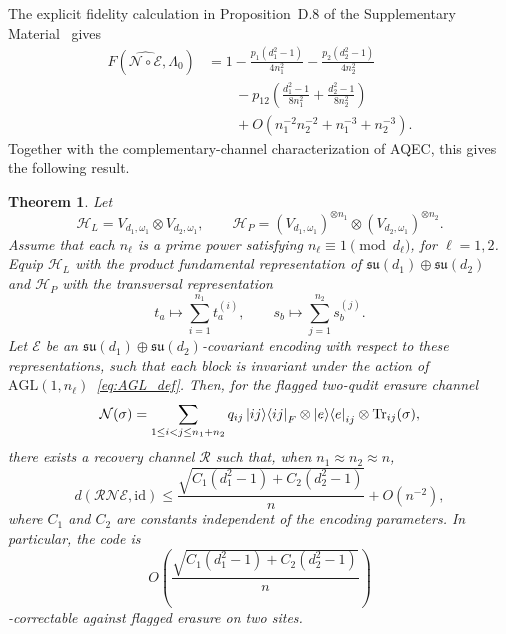 \documentclass[10pt,twocolumn,superscriptaddress,aps,amsmath,amssymb,citeautoscript,floatfix,prx,longbibliography]{revtex4-2}
\newtheorem{theorem}{Theorem}
\theoremstyle{plain}
\theoremstyle{plain}
\theoremstyle{plain}
\theoremstyle{plain}
\theoremstyle{plain}
\theoremstyle{plain}
\begin{document}
The explicit fidelity calculation in Proposition~D.8 of the Supplementary Material~\cite{SuppMat} gives
\begin{equation}\label{eq:fidelity_2}
\begin{aligned}
    F\left(\widehat{\mathcal N\circ\mathcal E},\Lambda_0\right)
    &=
    1
    -
    \frac{p_1(d_1^2-1)}{4n_1^2}
    -
    \frac{p_2(d_2^2-1)}{4n_2^2}
    \\
    &\qquad
    -
    p_{12}
    \left(
        \frac{d_1^2-1}{8n_1^2}
        +
        \frac{d_2^2-1}{8n_2^2}
    \right)
    \\
    &\qquad
    +
    O\left(n_1^{-2}n_2^{-2}+n_1^{-3}+n_2^{-3}\right).
\end{aligned}
\end{equation}
Together with the complementary-channel characterization of AQEC, this gives the following result.

\begin{theorem}
Let
$$
    \mathcal H_L
    =
    V_{d_1,\omega_1}
    \otimes
    V_{d_2,\omega_1},
    \qquad
    \mathcal H_P
    =
    (V_{d_1,\omega_1})^{\otimes n_1}
    \otimes
    (V_{d_2,\omega_1})^{\otimes n_2}.
$$
Assume that each $n_\ell$ is a prime power satisfying $n_\ell\equiv 1\pmod{d_\ell}$, for $\ell=1,2$. Equip $\mathcal H_L$ with the product fundamental representation of $\mathfrak{su}(d_1)\oplus\mathfrak{su}(d_2)$ and $\mathcal H_P$ with the transversal representation
$$
    t_a
    \longmapsto
    \sum_{i=1}^{n_1} t_a^{(i)},
    \qquad
    s_b
    \longmapsto
    \sum_{j=1}^{n_2} s_b^{(j)} .
$$
Let $\mathcal E$ be an $\mathfrak{su}(d_1)\oplus\mathfrak{su}(d_2)$-covariant encoding with respect to these representations, such that each block is invariant under the action of $\mathrm{AGL}(1,n_\ell)$~\eqref{eq:AGL_def}. Then, for the flagged two-qudit erasure channel
$$
    \mathcal N(\sigma)
    =
    \sum_{1\le i<j\le n_1+n_2}
    q_{ij}
    \ket{ij}\!\bra{ij}_F
    \otimes
    \ket e\!\bra e_{ij}
    \otimes
    \operatorname{Tr}_{ij}(\sigma),
$$
there exists a recovery channel $\mathcal R$ such that, when $n_1\approx n_2\approx n$,
$$
    d(\mathcal R\mathcal N\mathcal E,\mathrm{id})
    \le
    \frac{
        \sqrt{
            C_1(d_1^2-1)
            +
            C_2(d_2^2-1)
        }
    }{n}
    +
    O(n^{-2}),
$$
where $C_1$ and $C_2$ are constants independent of the encoding parameters. In particular, the code is
$$
    O\left(
        \frac{
            \sqrt{
                C_1(d_1^2-1)
                +
                C_2(d_2^2-1)
            }
        }{n}
    \right)
$$
-correctable against flagged erasure on two sites.
\end{theorem}
\end{document}
